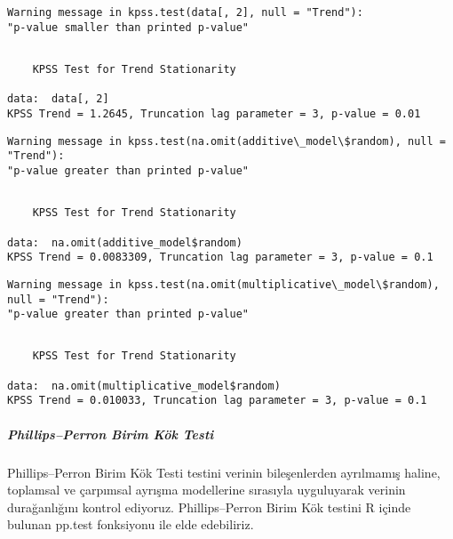 \documentclass[11pt]{article}
\begin{document}
    \begin{Verbatim}[commandchars=\\\{\}]
Warning message in kpss.test(data[, 2], null = "Trend"):
"p-value smaller than printed p-value"
    \end{Verbatim}

    
    \begin{verbatim}

	KPSS Test for Trend Stationarity

data:  data[, 2]
KPSS Trend = 1.2645, Truncation lag parameter = 3, p-value = 0.01

    \end{verbatim}

    
    \begin{Verbatim}[commandchars=\\\{\}]
Warning message in kpss.test(na.omit(additive\_model\$random), null = "Trend"):
"p-value greater than printed p-value"
    \end{Verbatim}

    
    \begin{verbatim}

	KPSS Test for Trend Stationarity

data:  na.omit(additive_model$random)
KPSS Trend = 0.0083309, Truncation lag parameter = 3, p-value = 0.1

    \end{verbatim}

    
    \begin{Verbatim}[commandchars=\\\{\}]
Warning message in kpss.test(na.omit(multiplicative\_model\$random), null = "Trend"):
"p-value greater than printed p-value"
    \end{Verbatim}

    
    \begin{verbatim}

	KPSS Test for Trend Stationarity

data:  na.omit(multiplicative_model$random)
KPSS Trend = 0.010033, Truncation lag parameter = 3, p-value = 0.1

    \end{verbatim}

\pagebreak    
    \subparagraph{Phillips--Perron Birim Kök
Testi}\label{phillipsperron-birim-kuxf6k-testi}

Phillips--Perron Birim Kök Testi testini verinin bileşenlerden
ayrılmamış haline, toplamsal ve çarpımsal ayrışma modellerine sırasıyla
uyguluyarak verinin durağanlığını kontrol ediyoruz. Phillips--Perron
Birim Kök testini R içinde bulunan pp.test fonksiyonu ile elde
edebiliriz.
\end{document}
